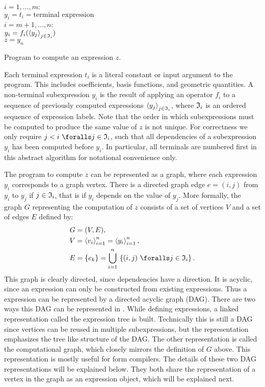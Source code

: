 \begin{algorithm}
\afor $i = 1, \ldots, m$:\\
\tab $ y_i =  t_i = \mbox{terminal expression}$ \\
\afor $i = m+1, \ldots, n$:\\
\tab $ y_i =  f_i(\left\langle{y_j}\right\rangle_{j\in\mathfrak{I}_i})$ \\
$z = y_n$
\caption{Program to compute an expression $z$.}
\label{ufl:alg:program}
\end{algorithm}

Each terminal expression $t_i$ is a literal constant or input argument to
the program. This includes coefficients, basis functions, and geometric
quantities.  A non-terminal subexpression $y_i$ is the result of applying
an operator $f_i$ to a sequence of previously computed expressions
$\left\langle{y_j}\right\rangle_{j\in\mathfrak{I}_i}$, where $\mathfrak{I}_i$ is an ordered sequence of
expression labels.  Note that the order in which subexpressions
must be computed to produce the same value of $z$ is not unique.
For correctness we only require $j < i \,\, \foralls j \in \mI_i$,
such that all dependencies of a subexpression $y_i$ has been computed
before $y_i$.  In particular, all terminals are numbered first in this
abstract algorithm for notational convenience only.

The program to compute $z$ can be represented as a graph, where each
expression $y_i$ corresponds to a graph vertex. There is a directed
graph edge $e = (i, j)$ from $y_i$ to $y_j$ if $j \in \mathfrak{I}_i$, that is
if $y_i$ depends on the value of $y_j$. More formally, the graph $G$
representing the computation of $z$ consists of a set of vertices $V$
and a set of edges $E$ defined by:
\begin{align}
G &= (V, E), \label{ufl:eq:G} \\
V &= \seq{v_i}_{i=1}^n = \seq{y_i}_{i=1}^n, \label{ufl:eq:V} \\
E &= \{ e_k \} = \bigcup_{i=1}^n \, \left\{ (i, j) \,\, \foralls j \in \mI_i \right\} . \label{ufl:eq:E}
\end{align}
This graph is clearly directed, since dependencies have a direction.
It is acyclic, since an expression can only be constructed from existing
expressions.  Thus a \ufl{} expression can be represented by a directed
acyclic graph (DAG).  There are two ways this DAG can be represented
in \ufl{}. While defining expressions, a linked representation called
the expression tree is built. Technically this is still a DAG since
vertices can be reused in multiple subexpressions, but the representation
emphasizes the tree like structure of the DAG. The other representation
is called the computational graph, which closely mirrors the definition
of $G$ above. This representation is mostly useful for form compilers.
The details of these two DAG representations will be explained below.
They both share the representation of a vertex in the graph as an
expression object, which will be explained next.

